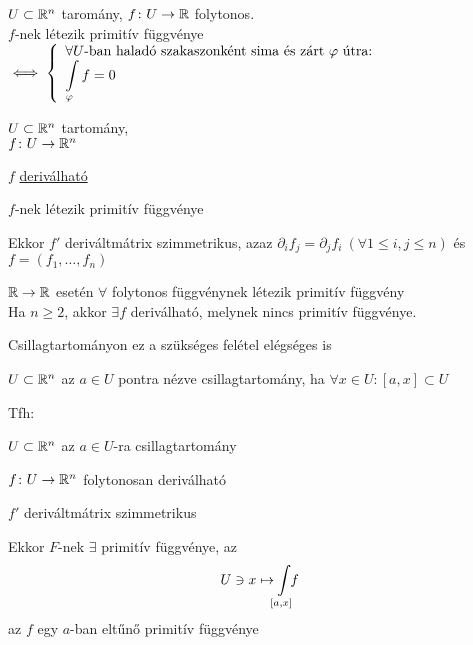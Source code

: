 \begin{te}
  $U\subset \mathbb{R}^n$ taromány, $f\colon U\to\mathbb{R}$ folytonos.\\
  $f$-nek létezik primitív függvénye $\ekviv \left\{\begin{array}{l}\forall U\text{-ban haladó szakaszonként sima és
  zárt }\vfi\text{ útra:}\\\di\Int_\vfi f= 0\end{array}\right.$
\end{te}

\begin{te}
  $U\subset\mathbb{R}^n$ tartomány,\\$f\colon U\to\mathbb{R}^n$
  \begin{enumzjr}
    \item $f$ \underline{deriválható}
    \item $f$-nek létezik primitív függvénye
  \end{enumzjr}
  Ekkor $f'$ deriváltmátrix szimmetrikus, azaz $\partial_if_j=\partial_jf_i\ (\forall 1\leq i,j\leq n)$ és
  $f=(f_1,\dotsc,f_n)$
\end{te}

\begin{Megj}
\item $\mathbb{R}\to\mathbb{R}$ esetén $\forall$ folytonos függvénynek létezik primitív függvény\\
  Ha $n\geq 2$, akkor $\exists f$ deriválható, melynek nincs primitív függvénye.
\item Csillagtartományon ez a szükséges felétel elégséges is
\end{Megj}
\begin{de}[Csillagtartomány]
  $U\subset \mathbb{R}^n$ az $a\in U$ pontra nézve csillagtartomány, ha $\forall x\in U: [a,x]\subset U$
\end{de}

\begin{te}
  Tfh:
  \begin{enumzjr}
  \item $U\subset \mathbb{R}^n$ az $a\in U$-ra csillagtartomány
  \item $f\colon U\to\mathbb{R}^n$ folytonosan deriválható
  \item $f'$ deriváltmátrix szimmetrikus
  \end{enumzjr}
  Ekkor $F$-nek $\exists$ primitív függvénye, az
  \[\di U\owns x\mapsto\!\!\Int_{[a,x]}\!\!\!f\]
  az  $f$ egy $a$-ban eltűnő primitív függvénye
\end{te}

